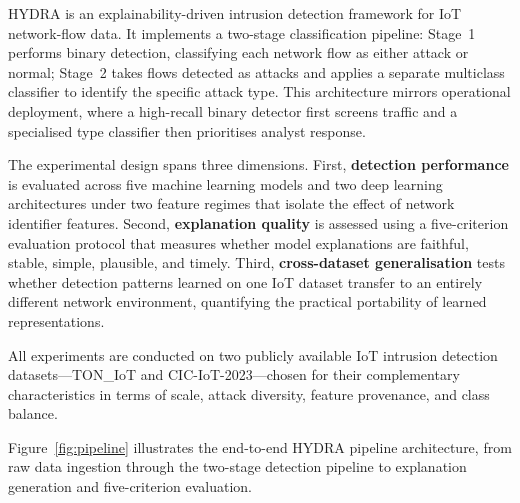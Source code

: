 \documentclass[12pt,a4paper]{report}
\begin{document}
HYDRA is an explainability-driven intrusion detection framework for IoT network-flow data. It implements a two-stage classification pipeline: Stage~1 performs binary detection, classifying each network flow as either attack or normal; Stage~2 takes flows detected as attacks and applies a separate multiclass classifier to identify the specific attack type. This architecture mirrors operational deployment, where a high-recall binary detector first screens traffic and a specialised type classifier then prioritises analyst response.

The experimental design spans three dimensions. First, \textbf{detection performance} is evaluated across five machine learning models and two deep learning architectures under two feature regimes that isolate the effect of network identifier features. Second, \textbf{explanation quality} is assessed using a five-criterion evaluation protocol that measures whether model explanations are faithful, stable, simple, plausible, and timely. Third, \textbf{cross-dataset generalisation} tests whether detection patterns learned on one IoT dataset transfer to an entirely different network environment, quantifying the practical portability of learned representations.

All experiments are conducted on two publicly available IoT intrusion detection datasets---TON\_IoT and CIC-IoT-2023---chosen for their complementary characteristics in terms of scale, attack diversity, feature provenance, and class balance.

Figure~\ref{fig:pipeline} illustrates the end-to-end HYDRA pipeline architecture, from raw data ingestion through the two-stage detection pipeline to explanation generation and five-criterion evaluation.
\end{document}
